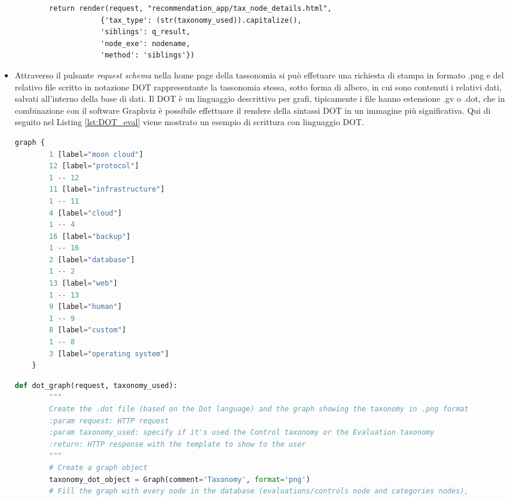 \begin{itemize}
\begin{lstlisting}
        return render(request, "recommendation_app/tax_node_details.html",
                    {'tax_type': (str(taxonomy_used)).capitalize(),
                    'siblings': q_result,
                    'node_exe': nodename,
                    'method': 'siblings'})
    \end{lstlisting}
    \item Attraverso il pulsante \textit{request schema} nella home page della tassonomia si può effetuare una richiesta di stampa in formato .png e del 
    relativo file scritto in notazione DOT rappresentante la tassonomia stessa, sotto forma di albero, in cui sono contenuti i relativi dati, salvati all'interno 
    della base di dati.\hfill\break
    Il DOT è un linguaggio descrittivo per grafi, tipicamente i file hanno estensione .gv o .dot, che in combinazione con il software Graphviz è possibile 
    effettuare il rendere della sintassi DOT in un immagine più significativa. Qui di seguito nel Listing \ref{lst:DOT_eval} viene mostrato un esempio di 
    scrittura con linguaggio DOT.
    \lstset{style=python_code_style}
    \begin{lstlisting}[language=Python, label=lst:DOT_eval, caption={Codice parziale utilizzato per realizzare lo schema della tassonomia
        per le Evaluation.}]
    graph {
        1 [label="moon cloud"]
        12 [label="protocol"]
        1 -- 12
        11 [label="infrastructure"]
        1 -- 11
        4 [label="cloud"]
        1 -- 4
        16 [label="backup"]
        1 -- 16
        2 [label="database"]
        1 -- 2
        13 [label="web"]
        1 -- 13
        9 [label="human"]
        1 -- 9
        8 [label="custom"]
        1 -- 8
        3 [label="operating system"]
    }
    \end{lstlisting}
    \lstset{style=python_code_style}
    \begin{lstlisting}[language=Python, label=lst:view_DOT_eval, caption={Codice utilizzato per la realizzazione del
        file .dot e relativa immagine .png.}]
    def dot_graph(request, taxonomy_used):
        """
        Create the .dot file (based on the Dot language) and the graph showing the taxonomy in .png format
        :param request: HTTP request
        :param taxonomy_used: specify if it's used the Control taxonomy or the Evaluation taxonomy
        :return: HTTP response with the template to show to the user
        """
        # Create a graph object
        taxonomy_dot_object = Graph(comment='Taxonomy', format='png')
        # Fill the graph with every node in the database (evaluations/controls node and categories nodes), 

\end{lstlisting}
\end{itemize}
